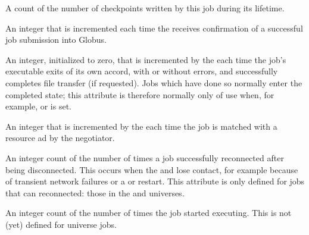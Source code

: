 \begin{description}
\item[\AdAttr{NumCkpts}:]  A count of the number of checkpoints
written by this job during its lifetime.

\item[\AdAttr{NumGlobusSubmits}:]   An integer that is incremented each
time the  receives confirmation of a successful job
submission into Globus.

\item[\AdAttr{NumJobCompletions}:]  An integer, initialized to zero,
that is incremented by the  each time the job's
executable exits of its own accord, with or without errors, and
successfully completes file transfer (if requested).  Jobs which have
done so normally enter the completed state; this attribute is therefore
normally only of use when, for example,  or
 is set.

\item[\AdAttr{NumJobMatches}:]  An integer that is incremented by the
 each time the job is matched with a resource ad by the
negotiator.

\item[\AdAttr{NumJobReconnects}:]  An integer count of the number of times a
  job successfully reconnected after being disconnected.
  This occurs when the
   and  lose contact,
  for example because of
  transient network failures or a  or 
  restart.
  This attribute is only defined for jobs that can reconnected:
  those in the  and  universes.

\item[\AdAttr{NumJobStarts}:]  An integer count of the number of times the
  job started executing.
  This is not (yet) defined for  universe jobs.


\end{description}
